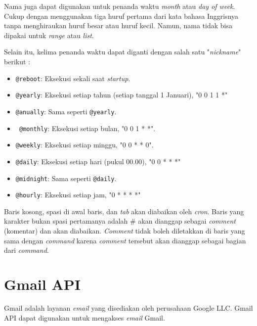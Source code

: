 Nama juga dapat digunakan untuk penanda waktu \textit{month} atau \textit{day of week}. Cukup dengan menggunakan tiga huruf pertama dari kata bahasa Inggrisnya tanpa menghiraukan huruf besar atau huruf kecil. Namun, nama tidak bisa dipakai untuk \textit{range} atau \textit{list}.  

Selain itu, kelima penanda waktu dapat diganti dengan salah satu "\textit{nickname}" berikut :
\begin{itemize}
\item \texttt{@reboot}: Eksekusi sekali saat \textit{startup}.
\item \texttt{@yearly}: Eksekusi setiap tahun (setiap tanggal 1 Januari), "0 0 1 1 *"
\item \texttt{@anually}: Sama seperti \texttt{@yearly}.
\item\texttt{ @monthly}: Eksekusi setiap bulan, "0 0 1 * *".
\item \texttt{@weekly}: Eksekusi setiap minggu, "0 0 * * 0".
\item \texttt{@daily}: Eksekusi setiap hari (pukul 00.00), "0 0 * * *"
\item \texttt{@midnight}: Sama seperti \texttt{@daily}.
\item \texttt{@hourly}: Eksekusi setiap jam, "0 * * * *"
\end{itemize}

Baris kosong, spasi di awal baris, dan \textit{tab} akan diabaikan oleh \textit{cron}. Baris yang karakter bukan spasi pertamanya  adalah \# akan dianggap sebagai \textit{comment} (komentar) dan akan diabaikan. \textit{Comment} tidak boleh diletakkan di baris yang sama dengan \textit{command} karena \textit{comment} tersebut akan dianggap sebagai bagian dari \textit{command}.

\section{Gmail API ~\cite{gmail-api}}
\label{sec:gmail-api}
Gmail adalah layanan \textit{email} yang disediakan oleh perusahaan Google LLC. Gmail API dapat digunakan untuk mengakses \textit{email} Gmail.

